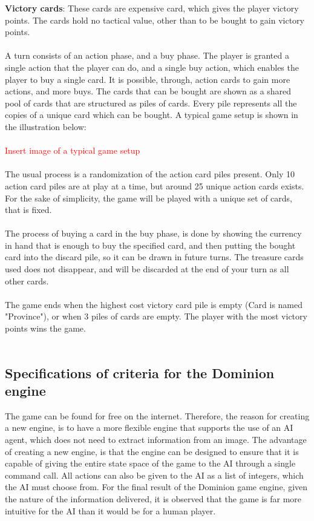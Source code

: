 \textbf{Victory cards}:
These cards are expensive card, which gives the player victory points. The cards hold no tactical value, other than to be bought to gain victory points.\\\\
A turn consists of an action phase, and a buy phase. The player is granted a single action that the player can do, and a single buy action, which enables the player to buy a single card. It is possible, through, action cards to gain more actions, and more buys. The cards that can be bought are shown as a shared pool of cards that are structured as piles of cards. Every pile represents all the copies of a unique card which can be bought. A typical game setup is shown in the illustration below:\\\\
\textcolor{red}{Insert image of a typical game setup}\\\\
The usual process is a randomization of the action card piles present. Only 10 action card piles are at play at a time, but around 25 unique action cards exists. For the sake of simplicity, the game will be played with a unique set of cards, that is fixed.\\\\
The process of buying a card in the buy phase, is done by showing the currency in hand that is enough to buy the specified card, and then putting the bought card into the discard pile, so it can be drawn in future turns. The treasure cards used does not disappear, and will be discarded at the end of your turn as all other cards.\\\\
The game ends when the highest cost victory card pile is empty (Card is named "Province"), or when 3 piles of cards are empty. The player with the most victory points wins the game.\\\\


\subsection{Specifications of criteria for the Dominion engine}
The game can be found for free on the internet. Therefore, the reason for creating a new engine, is to have a more flexible engine that supports the use of an AI agent, which does not need to extract information from an image. The advantage of creating a new engine, is that the engine can be designed to ensure that it is capable of giving the entire state space of the game to the AI through a single command call. All actions can also be given to the AI as a list of integers, which the AI must choose from. For the final result of the Dominion game engine, given the nature of the information delivered, it is observed that the game is far more intuitive for the AI than it would be for a human player.

